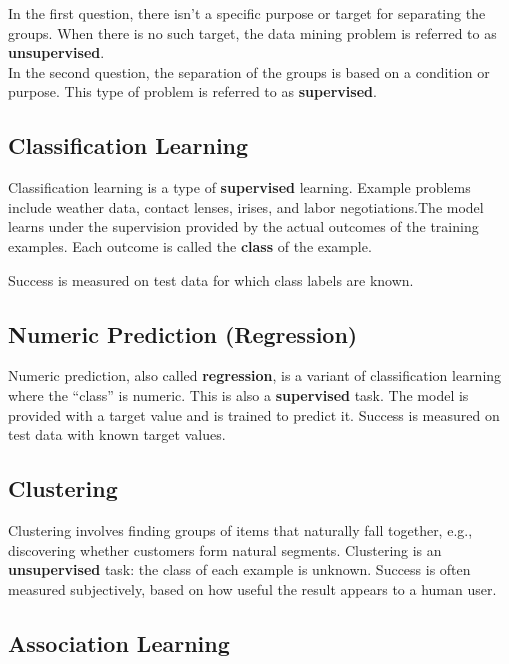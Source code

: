     In the first question, there isn't a specific purpose or target for separating the groups. When there is no such target, the data mining problem is referred to as \textbf{unsupervised}.\\
    
    In the second question, the separation of the groups is based on a condition or purpose. This type of problem is referred to as \textbf{supervised}.


\subsection{Classification Learning}

Classification learning is a type of \textbf{supervised} learning. Example problems include weather data, contact lenses, irises, and labor negotiations.The model learns under the supervision provided by the actual outcomes of the training examples. Each outcome is called the \textbf{class} of the example.  

Success is measured on test data for which class labels are known.


\subsection{Numeric Prediction (Regression)}

Numeric prediction, also called \textbf{regression}, is a variant of classification learning where the “class” is numeric. This is also a \textbf{supervised} task. The model is provided with a target value and is trained to predict it. Success is measured on test data with known target values.


\subsection{Clustering}

Clustering involves finding groups of items that naturally fall together, e.g., discovering whether customers form natural segments.  Clustering is an \textbf{unsupervised} task: the class of each example is unknown. Success is often measured subjectively, based on how useful the result appears to a human user.



\subsection{Association Learning}

